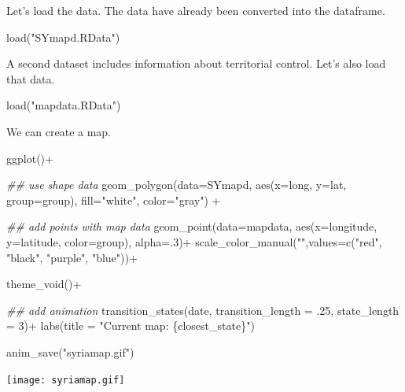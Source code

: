 \documentclass[
  letterpaper,
  DIV=11,
  numbers=noendperiod]{scrreprt}
\newenvironment{Shaded}{\begin{snugshade}}{\end{snugshade}}
\newcommand{\AttributeTok}[1]{\textcolor[rgb]{0.40,0.45,0.13}{#1}}
\newcommand{\DecValTok}[1]{\textcolor[rgb]{0.68,0.00,0.00}{#1}}
\newcommand{\DocumentationTok}[1]{\textcolor[rgb]{0.37,0.37,0.37}{\textit{#1}}}
\newcommand{\FunctionTok}[1]{\textcolor[rgb]{0.28,0.35,0.67}{#1}}
\newcommand{\NormalTok}[1]{\textcolor[rgb]{0.00,0.23,0.31}{#1}}
\newcommand{\SpecialCharTok}[1]{\textcolor[rgb]{0.37,0.37,0.37}{#1}}
\newcommand{\StringTok}[1]{\textcolor[rgb]{0.13,0.47,0.30}{#1}}
\begin{document}
Let's load the data. The data have already been converted into the
dataframe.

\begin{Shaded}
\begin{Highlighting}[]
\FunctionTok{load}\NormalTok{(}\StringTok{"SYmapd.RData"}\NormalTok{)}
\end{Highlighting}
\end{Shaded}

A second dataset includes information about territorial control. Let's
also load that data.

\begin{Shaded}
\begin{Highlighting}[]
\FunctionTok{load}\NormalTok{(}\StringTok{"mapdata.RData"}\NormalTok{)}
\end{Highlighting}
\end{Shaded}

We can create a map.

\begin{Shaded}
\begin{Highlighting}[]
\FunctionTok{ggplot}\NormalTok{()}\SpecialCharTok{+}
  
  \DocumentationTok{\#\# use shape data}
   \FunctionTok{geom\_polygon}\NormalTok{(}\AttributeTok{data=}\NormalTok{SYmapd, }\FunctionTok{aes}\NormalTok{(}\AttributeTok{x=}\NormalTok{long, }\AttributeTok{y=}\NormalTok{lat, }\AttributeTok{group=}\NormalTok{group),}
                \AttributeTok{fill=}\StringTok{"white"}\NormalTok{, }\AttributeTok{color=}\StringTok{"gray"}\NormalTok{) }\SpecialCharTok{+}  
  
  \DocumentationTok{\#\# add points with map data}
   \FunctionTok{geom\_point}\NormalTok{(}\AttributeTok{data=}\NormalTok{mapdata, }\FunctionTok{aes}\NormalTok{(}\AttributeTok{x=}\NormalTok{longitude, }\AttributeTok{y=}\NormalTok{latitude, }\AttributeTok{color=}\NormalTok{group), }\AttributeTok{alpha=}\NormalTok{.}\DecValTok{3}\NormalTok{)}\SpecialCharTok{+}
   \FunctionTok{scale\_color\_manual}\NormalTok{(}\StringTok{""}\NormalTok{,}\AttributeTok{values=}\FunctionTok{c}\NormalTok{(}\StringTok{"red"}\NormalTok{, }\StringTok{"black"}\NormalTok{, }\StringTok{"purple"}\NormalTok{, }\StringTok{"blue"}\NormalTok{))}\SpecialCharTok{+}
  
  
   \FunctionTok{theme\_void}\NormalTok{()}\SpecialCharTok{+} 
  
  \DocumentationTok{\#\# add animation}
   \FunctionTok{transition\_states}\NormalTok{(date, }\AttributeTok{transition\_length =}\NormalTok{ .}\DecValTok{25}\NormalTok{, }\AttributeTok{state\_length =} \DecValTok{3}\NormalTok{)}\SpecialCharTok{+}
   \FunctionTok{labs}\NormalTok{(}\AttributeTok{title =} \StringTok{"Current map: \{closest\_state\}"}\NormalTok{)}

\FunctionTok{anim\_save}\NormalTok{(}\StringTok{"syriamap.gif"}\NormalTok{)}
\end{Highlighting}
\end{Shaded}

\texttt{[image: syriamap.gif]}
\end{document}
